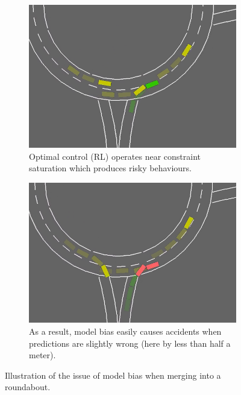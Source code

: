 \begin{figure}[ht]
	\begin{center}
		\begin{subfigure}[t]{0.45\linewidth}
			\includegraphics[width=\linewidth]{img/bias-oracle}
			\caption{Optimal control (\gls{RL}) operates near constraint saturation which produces risky behaviours.}
			\label{fig:bias-oracle}
		\end{subfigure}\hfill
		\begin{subfigure}[t]{0.46\linewidth}
			\includegraphics[width=\linewidth]{img/bias-bias}
			\caption{As a result, model bias easily causes accidents when predictions are slightly wrong (here by less than half a meter).}
			\label{fig:bias-bias}
		\end{subfigure}
		\caption[Illustration of the issue of model bias when merging into a roundabout.]{Illustration of the issue of model bias when merging into a roundabout.\footnotemark}
	\end{center}
\end{figure}


